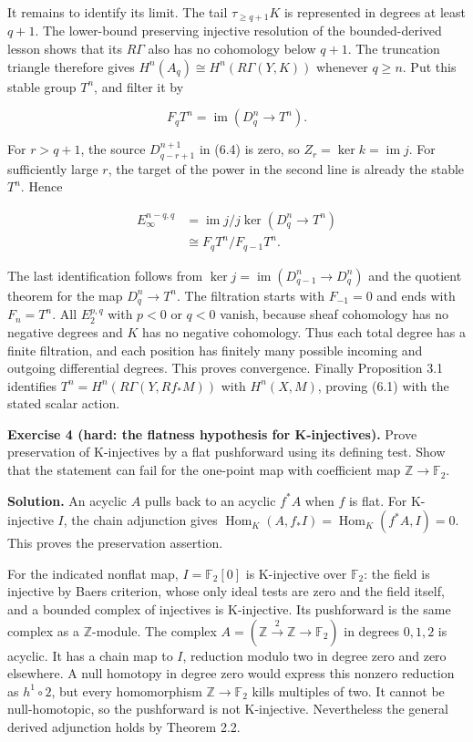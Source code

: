 \documentclass[
  english,
  11pt,
  a4paper,
]{article}
\begin{document}
It remains to identify its limit. The tail \(\tau_{\ge q+1}K\) is
represented in degrees at least \(q+1\). The lower-bound preserving
injective resolution of the bounded-derived lesson shows that its
\(R\Gamma\) also has no cohomology below \(q+1\). The truncation
triangle therefore gives \(H^n(A_q)\cong H^n(R\Gamma(Y,K))\) whenever
\(q\ge n\). Put this stable group \(T^n\), and filter it by

\[F_qT^n=\operatorname{im}(D_q^n\longrightarrow T^n).
\tag{6.5}\]

For \(r>q+1\), the source \(D_{q-r+1}^{n+1}\) in (6.4) is zero, so
\(Z_r=\ker k=\operatorname{im}j\). For sufficiently large \(r\), the
target of the power in the second line is already the stable \(T^n\).
Hence

\[\begin{aligned}
E_\infty^{n-q,q}
&=\operatorname{im}j\big/
j\ker(D_q^n\to T^n)\\
&\cong F_qT^n/F_{q-1}T^n.
\end{aligned}
\tag{6.6}\]

The last identification follows from
\(\ker j=\operatorname{im}(D_{q-1}^n\to D_q^n)\) and the quotient
theorem for the map \(D_q^n\to T^n\). The filtration starts with
\(F_{-1}=0\) and ends with \(F_n=T^n\). All \(E_2^{p,q}\) with \(p<0\)
or \(q<0\) vanish, because sheaf cohomology has no negative degrees and
\(K\) has no negative cohomology. Thus each total degree has a finite
filtration, and each position has finitely many possible incoming and
outgoing differential degrees. This proves convergence. Finally
Proposition 3.1 identifies \(T^n=H^n(R\Gamma(Y,Rf_*M))\) with
\(H^n(X,M)\), proving (6.1) with the stated scalar action.

\textbf{Exercise 4 (hard: the flatness hypothesis for K-injectives).}
Prove preservation of K-injectives by a flat pushforward using its
defining test. Show that the statement can fail for the one-point map
with coefficient map \(\mathbb Z\to\mathbb F_2\).

\textbf{Solution.} An acyclic \(A\) pulls back to an acyclic \(f^*A\)
when \(f\) is flat. For K-injective \(I\), the chain adjunction gives
\(\operatorname{Hom}_K(A,f_*I)=\operatorname{Hom}_K(f^*A,I)=0\). This
proves the preservation assertion.

For the indicated nonflat map, \(I=\mathbb F_2[0]\) is K-injective over
\(\mathbb F_2\): the field is injective by Baer\textquotesingle s
criterion, whose only ideal tests are zero and the field itself, and a
bounded complex of injectives is K-injective. Its pushforward is the
same complex as a \(\mathbb Z\)-module. The complex
\(A=(\mathbb Z\xrightarrow{2}\mathbb Z\to\mathbb F_2)\) in degrees
\(0,1,2\) is acyclic. It has a chain map to \(I\), reduction modulo two
in degree zero and zero elsewhere. A null homotopy in degree zero would
express this nonzero reduction as \(h^1\circ2\), but every homomorphism
\(\mathbb Z\to\mathbb F_2\) kills multiples of two. It cannot be
null-homotopic, so the pushforward is not K-injective. Nevertheless the
general derived adjunction holds by Theorem 2.2.
\end{document}
